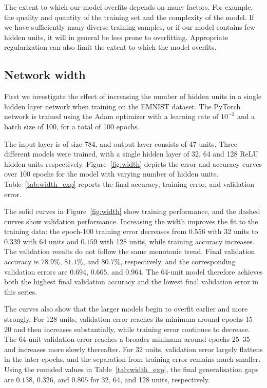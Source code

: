 \documentclass{article}
\begin{document}
The extent to which our model overfits depends on many factors.
For example, the quality and quantity of the training set and the complexity of the model. 
If we have sufficiently many diverse training samples, or if our model contains few hidden units, it will in general be less prone to overfitting. 
Appropriate regularization can also limit the extent to which the model overfits.


\subsection{Network width}

\questionTableOne
\questionFigureTwo

First we investigate the effect of increasing the number of hidden units in a single hidden layer network when training on the EMNIST dataset.
The PyTorch network is trained using the Adam optimizer
with a learning rate of $10^{-3}$ and a batch size of 100, for a total of 100 epochs.

The input layer is of size 784, and output layer consists of 47 units. 
Three different models were trained, with a single hidden layer of 32, 64 and 128 ReLU hidden units respectively.
Figure~\ref{fig:width} depicts the error and accuracy curves over 100 epochs for the model with varying number of hidden units.
Table~\ref{tab:width_exp} reports the final accuracy, training error, and validation error.

The solid curves in Figure~\ref{fig:width} show training performance, and the dashed curves show validation performance.
Increasing the width improves the fit to the training data: the epoch-100 training error decreases from $0.556$ with 32 units to $0.339$ with 64 units and $0.159$ with 128 units, while training accuracy increases.
The validation results do not follow the same monotonic trend.
Final validation accuracy is $78.9\%$, $81.1\%$, and $80.7\%$, respectively, and the corresponding validation errors are $0.694$, $0.665$, and $0.964$.
The 64-unit model therefore achieves both the highest final validation accuracy and the lowest final validation error in this series.

The curves also show that the larger models begin to overfit earlier and more strongly.
For 128 units, validation error reaches its minimum around epochs 15--20 and then increases substantially, while training error continues to decrease.
The 64-unit validation error reaches a broader minimum around epochs 25--35 and increases more slowly thereafter.
For 32 units, validation error largely flattens in the later epochs, and the separation from training error remains much smaller.
Using the rounded values in Table~\ref{tab:width_exp}, the final generalisation gaps are $0.138$, $0.326$, and $0.805$ for 32, 64, and 128 units, respectively.
\end{document}
